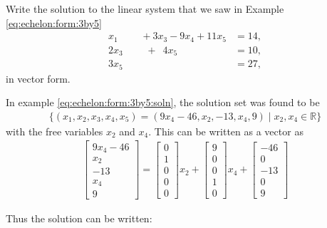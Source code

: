  \begin{example} \label{ex:large:linear:solution}
 Write the solution to the linear system that we saw in Example \ref{eq:echelon:form:3by5}
\begin{align*}
x_1\phantom{+2x_3} + 3x_3 -9 x_4 + 11 x_5 & = 14, \\
2x_3 \phantom{-9x_4} +\phantom{1} 4x_5 & = 10, \\
3x_5 & = 27,
\end{align*}
in vector form.

\solution

In example \ref{eq:echelon:form:3by5:soln}, the solution set was found to be
%
\begin{align*}
\{ (x_1,x_2,x_3,x_4,x_5) = (9x_4-46,x_2,-13,x_4,9) \; | \; x_2, x_4 \in \mathbb{R}\}
\end{align*}
with the free variables $x_2$ and $x_4$.  This can be written as a vector as
%
\begin{align*}
\begin{bmatrix}
9x_4 - 46 \\
x_2 \\
-13 \\
x_4 \\
9
\end{bmatrix} =
\begin{bmatrix}
0 \\ 1 \\ 0 \\ 0 \\0
\end{bmatrix} x_2 +
\begin{bmatrix}
9 \\ 0 \\ 0 \\ 1 \\ 0
\end{bmatrix} x_4 +
\begin{bmatrix}
-46 \\ 0 \\ -13 \\ 0 \\ 9
\end{bmatrix}
\end{align*}

Thus the solution can be written:


\end{example}
